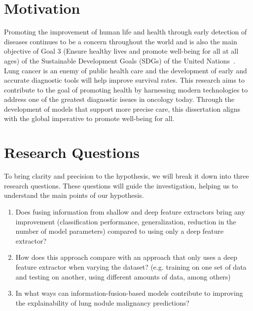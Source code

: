 \section{Motivation} \label{sec:Motivation}

Promoting the improvement of human life and health through early detection of diseases continues to be a concern throughout the world and is also the main objective of Goal 3 (Ensure healthy lives and promote well-being for all at all ages) of the Sustainable Development Goals (SDGs) of the United Nations~\cite{un_sdg}. Lung cancer is an enemy of public health care and the development of early and accurate diagnostic tools will help improve survival rates.
This research aims to contribute to the goal of promoting health by harnessing modern technologies to address one of the greatest diagnostic issues in oncology today. Through the development of models that support more precise care, this dissertation aligns with the global imperative to promote well-being for all.


\section{Research Questions}
To bring clarity and precision to the hypothesis, we will break it down into three research questions. These questions will guide the investigation, helping us to understand the main points of our hypothesis.

\begin{enumerate}
    \item Does fusing information from shallow and deep feature extractors bring any improvement (classification performance, generalization, reduction in the number of model parameters) compared to using only a deep feature extractor?
    \item How does this approach compare with an approach that only uses a deep feature extractor when varying the dataset? (e.g. training on one set of data and testing on another, using different amounts of data, among others)
    \item In what ways can information-fusion-based models contribute to improving the explainability of lung nodule malignancy predictions?

\end{enumerate}





